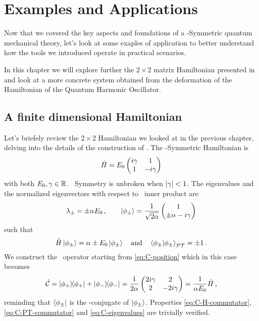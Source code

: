 \chapter{Examples and Applications}\label{ch:examples}
    Now that we covered the key aspects and foundations of a \PT-Symmetric quantum mechanical theory, let's look at some exaples of application to better understand how the tools we introduced operate in practical scenarios.
    
    In this chapter we will explore further the $2\times2$ matrix Hamiltonian presented in  and look at a more concrete system obtained from the deformation of the Hamiltonian of the Quantum Harmonic Oscillator.
    \section{A finite dimensional Hamiltonian}
        Let's briefely review the $2\times2$ Hamiltonian we looked at in the previous chapter, delving into the details of the construction of \hC. The \PT-Symmetric Hamiltonian is
        \begin{equation}
            \hH = E_0 \pmqty{\dmat[1]{i\gamma, -i\gamma}}
        \end{equation}
        with both $E_0,\gamma \in \mathbb{R}$. \PT\ Symmetry is unbroken when $\abs{\gamma} < 1$. The eigenvalues and the normalized eigenvectors with respect to \PT\ inner product are
        \begin{equation*}
            \lambda_\pm = \pm \alpha E_0
            \mycomma
            \qquad
            \ket{\phi_\pm} = \frac{1}{\sqrt{2\alpha}} \pmqty{1 \\ \pm\alpha - i \gamma}
        \end{equation*}
        such that
        \begin{equation*}
            \hH\ket{\phi_\pm} = \alpha \pm E_0 \ket{\phi_\pm}
            \qand
            \braket{\phi_\pm}{\phi_\pm}_{\PT} = \pm 1
            \myperiod
        \end{equation*}
        We construct the \hC\ operator starting from \eqref{eq:C-position} which in this case becomes
        \begin{equation}
            \hC = \dyad{\phi_+}{\phi_+} + \dyad{\phi_-}{\phi_-} = \frac{1}{2\alpha}\pmqty{\dmat[2]{2i\gamma, -2i\gamma}} = \frac{1}{\alpha E_0}\hH
            \mycomma
        \end{equation}
        reminding that $\bra{\phi_\pm}$ is the \PT-conjugate of $\ket{\phi_\pm}$. Properties \eqref{eq:C-H-commutator}, \eqref{eq:C-PT-commutator} and \eqref{eq:C-eigenvalues} are trivially verified.

